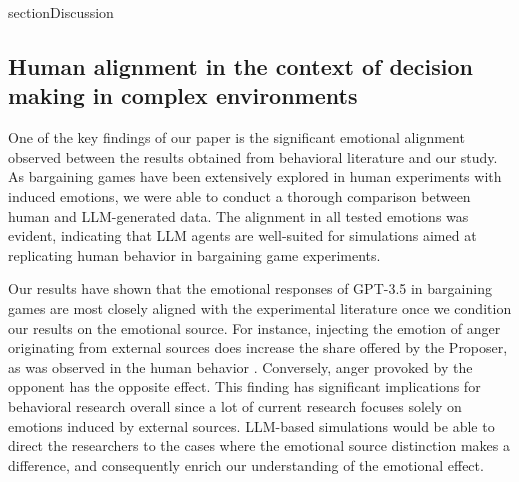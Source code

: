 \documentclass{article}
\begin{document}


section{Discussion}\label{sec:discussion}

\subsection{Human alignment in the context of decision making in complex environments}

One of the key findings of our paper is the significant emotional alignment observed between the results obtained from behavioral literature and our study. As bargaining games have been extensively explored in human experiments with induced emotions, we were able to conduct a thorough comparison between human and LLM-generated data. The alignment in all tested emotions was evident, indicating that LLM agents are well-suited for simulations aimed at replicating human behavior in bargaining game experiments. 

Our results have shown that the emotional responses of GPT-3.5 in bargaining games are most closely aligned with the experimental literature once we condition our results on the emotional source. For instance, injecting the emotion of anger originating from external sources does increase the share offered by the Proposer, as was observed in the human behavior \cite{ANDRADE20091}. Conversely, anger provoked by the opponent has the opposite effect. This finding has significant implications for behavioral research overall since a lot of current research focuses solely on emotions induced by external sources. LLM-based simulations would be able to direct the researchers to the cases where the emotional source distinction makes a difference, and consequently enrich our understanding of the emotional effect.
\end{document}
